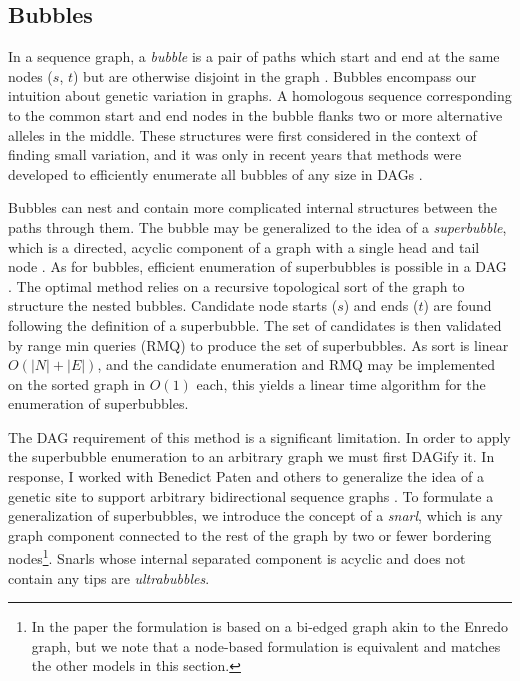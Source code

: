 \subsection{Bubbles}

In a sequence graph, a \emph{bubble} is a pair of paths which start and end at the same nodes ($s$, $t$) but are otherwise disjoint in the graph \cite{zerbino2008velvet}.
Bubbles encompass our intuition about genetic variation in graphs.
A homologous sequence corresponding to the common start and end nodes in the bubble flanks two or more alternative alleles in the middle.
These structures were first considered in the context of finding small variation, and it was only in recent years that methods were developed to efficiently enumerate all bubbles of any size in DAGs \cite{birmele2012efficient}.

Bubbles can nest and contain more complicated internal structures between the paths through them.
The bubble may be generalized to the idea of a \emph{superbubble}, which is a directed, acyclic component of a graph with a single head and tail node \cite{onodera2013detecting}.
As for bubbles, efficient enumeration of superbubbles is possible in a DAG \cite{brankovic2016linear}.
The optimal method relies on a recursive topological sort of the graph to structure the nested bubbles.
Candidate node starts ($s$) and ends ($t$) are found following the definition of a superbubble.
The set of candidates is then validated by range min queries (RMQ) to produce the set of superbubbles.
As sort is linear $O(|N| + |E|)$, and the candidate enumeration and RMQ may be implemented on the sorted graph in $O(1)$ each, this yields a linear time algorithm for the enumeration of superbubbles.

The DAG requirement of this method is a significant limitation.
In order to apply the superbubble enumeration to an arbitrary graph we must first DAGify it.
In response, I worked with Benedict Paten and others to generalize the idea of a genetic site to support arbitrary bidirectional sequence graphs \cite{paten2018superbubbles}.
To formulate a generalization of superbubbles, we introduce the concept of a \emph{snarl}, which is any graph component connected to the rest of the graph by two or fewer bordering nodes\footnote{In the paper the formulation is based on a bi-edged graph akin to the Enredo graph, but we note that a node-based formulation is equivalent and matches the other models in this section.}.
Snarls whose internal separated component is acyclic and does not contain any tips are \emph{ultrabubbles}.

